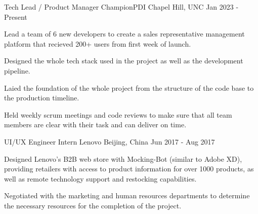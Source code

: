 \begin{cventries}
    \cventry
    {Tech Lead / Product Manager} %
    {ChampionPDI} %
    {Chapel Hill, UNC} %
    {Jan 2023 - Present} %
    {
      \begin{cvitems} %
        \item {Lead a team of 6 new developers to create a sales representative management platform that recieved 200+ users from first week of launch.}
        \item {Designed the whole tech stack used in the project as well as the development pipeline.}
        \item {Laied the foundation of the whole project from the structure of the code base to the production timeline.}
        \item {Held weekly scrum meetings and code reviews to make sure that all team members are clear with their task and can deliver on time.}
      \end{cvitems}
    }

    \cventry
    {UI/UX Engineer Intern} %
    {Lenovo} %
    {Beijing, China} %
    {Jun 2017 - Aug 2017} %
    {
      \begin{cvitems} %
        \item {Designed Lenovo's B2B web store with Mocking-Bot (similar to Adobe XD), providing retailers with access to product information for over 1000 products, as well as remote technology support and restocking capabilities.}
        \item {Negotiated with the marketing and human resources departments to determine the necessary resources for the completion of the project.}
      \end{cvitems}
    }
    
    

\end{cventries}
